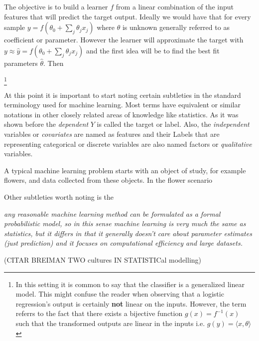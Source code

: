 The objective is to build a learner $f$ from a linear combination of the input features that will predict the target output. Ideally we would have that for every sample $y =  f\left(\theta_0 + \sum_{j}\theta_jx_j\right)$ where $\theta$ is unknown generally referred to as coefficient or parameter. However the learner will approximate the target with $y \approx \hat{y} = f\left(\theta_0 +\sum_{j}\theta_jx_j\right)$ and the first idea will be to find the best fit parameters $\hat{\theta}$. Then 

\footnote{In this setting it is common to say that the classifier is a generalized linear model. This might confuse the reader when observing that a logistic regression's output is certainly \textbf{not} linear on the inputs. However, the term referrs to the fact that there exists a bijective function $g(x) = f^{-1}(x)$ such that the transformed outputs are linear in the inputs i.e. $g(y) = \langle x, \theta \rangle$ }

At this point it is important to start noting certain subtleties in the standard terminology used for machine learning. Most terms have equivalent or similar notations in other closely related areas of knowledge like statistics. As it was shown before the \textit{dependent} $Y$ is called the target or label. Also, the \textit{independent} variables or \textit{covariates} are named as features and their 
Labels that are representing categorical or discrete variables are also named factors or \textit{qualitative} variables. 



A typical machine learning problem starts with an object of study, for example flowers, and data collected from these objects. In the flower scenario 

Other subtleties worth noting is the 

\textit{any reasonable machine learning method can be formulated as a formal probabilistic model, so in this sense machine learning is very much the same as statistics, but it differs in that it generally doesn't care about parameter estimates (just prediction) and it focuses on computational efficiency and large datasets.}

(CITAR BREIMAN \cite{breiman-statisticalmodeling} TWO cultures IN STATISTICal modelling)


